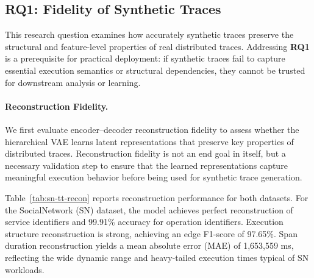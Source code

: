 \documentclass[sigconf,review]{acmart}
\begin{document}


\subsection{RQ1: Fidelity of Synthetic Traces}
\label{sec:rq1}

This research question examines how accurately synthetic traces preserve the structural and feature-level properties of real distributed traces. Addressing \textbf{RQ1} is a prerequisite for practical deployment: if synthetic traces fail to capture essential execution semantics or structural dependencies, they cannot be trusted for downstream analysis or learning.

\paragraph{Reconstruction Fidelity.}
We first evaluate encoder--decoder reconstruction fidelity to assess whether the hierarchical VAE learns latent representations that preserve key properties of distributed traces. Reconstruction fidelity is not an end goal in itself, but a necessary validation step to ensure that the learned representations capture meaningful execution behavior before being used for synthetic trace generation.

Table~\ref{tab:sn-tt-recon} reports reconstruction performance for both datasets. For the SocialNetwork (SN) dataset, the model achieves perfect reconstruction of service identifiers and 99.91\% accuracy for operation identifiers. Execution structure reconstruction is strong, achieving an edge F1-score of 97.65\%. Span duration reconstruction yields a mean absolute error (MAE) of 1,653,559 ms, reflecting the wide dynamic range and heavy-tailed execution times typical of SN workloads.
\end{document}
